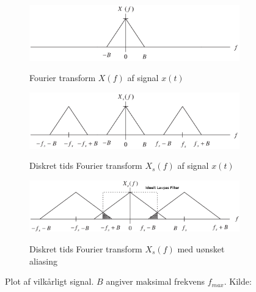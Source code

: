 \begin{figure}[h!]
	\centering
	\begin{subfigure}[b]{.7\textwidth}
		\centering
		\includegraphics[width=\textwidth]{billeder/aliasing1.png}
		\label{fig:alias1}
		\caption{Fourier transform $X(f)$ af signal $x(t)$}
	\end{subfigure}
	\begin{subfigure}[b]{.7\textwidth}
		\includegraphics[width=\textwidth]{billeder/aliasing2.png}
		\label{fig:alias2}
		\caption{Diskret tids Fourier transform $X_s(f)$ af signal $x(t)$}
	\end{subfigure}
	\begin{subfigure}[b]{.7\textwidth}
		\includegraphics[width=\textwidth]{billeder/aliasing4.png}
		\label{fig:alias4}
		\caption{Diskret tids Fourier transform $X_s(f)$ med uønsket aliasing}
	\end{subfigure}
	\caption{Plot af vilkårligt signal. $B$ angiver maksimal frekvens $f_{max}$. Kilde:\protect\cite{Tan2013}}
	\label{fig:alias}
\end{figure}

